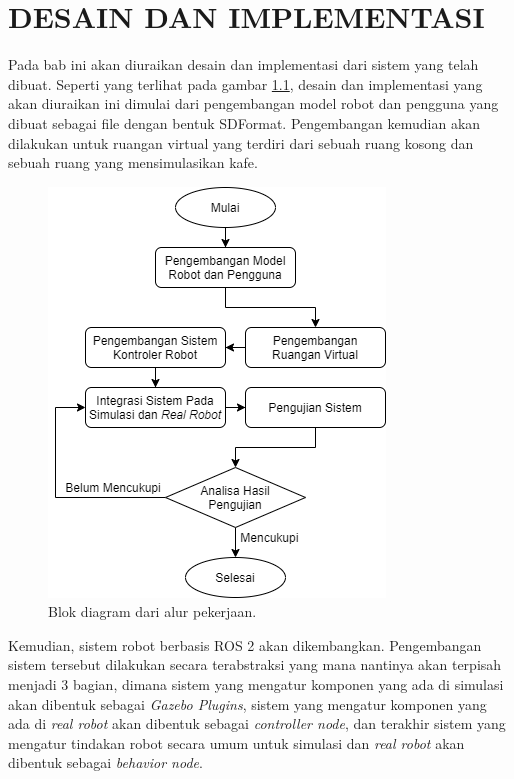 \chapter{DESAIN DAN IMPLEMENTASI}
\label{chap:desainimplementasi}

Pada bab ini akan diuraikan desain dan implementasi dari sistem yang telah dibuat.
Seperti yang terlihat pada gambar \ref{fig:blogdiagramkerja},
  desain dan implementasi yang akan diuraikan ini dimulai dari pengembangan model robot dan pengguna yang dibuat sebagai file dengan bentuk SDFormat.
Pengembangan kemudian akan dilakukan untuk ruangan virtual yang terdiri dari sebuah ruang kosong dan sebuah ruang yang mensimulasikan kafe.

\begin{figure}[ht]
  \centering
  \includegraphics[scale=0.6]{gambar/blok-diagram-kerja.png}
  \caption{Blok diagram dari alur pekerjaan.}
  \label{fig:blogdiagramkerja}
\end{figure}

Kemudian, sistem robot berbasis ROS 2 akan dikembangkan.
Pengembangan sistem tersebut dilakukan secara terabstraksi yang mana nantinya akan terpisah menjadi 3 bagian,
  dimana sistem yang mengatur komponen yang ada di simulasi akan dibentuk sebagai \emph{Gazebo Plugins},
  sistem yang mengatur komponen yang ada di \emph{real robot} akan dibentuk sebagai \emph{controller node},
  dan terakhir sistem yang mengatur tindakan robot secara umum untuk simulasi dan \emph{real robot} akan dibentuk sebagai \emph{behavior node}.

